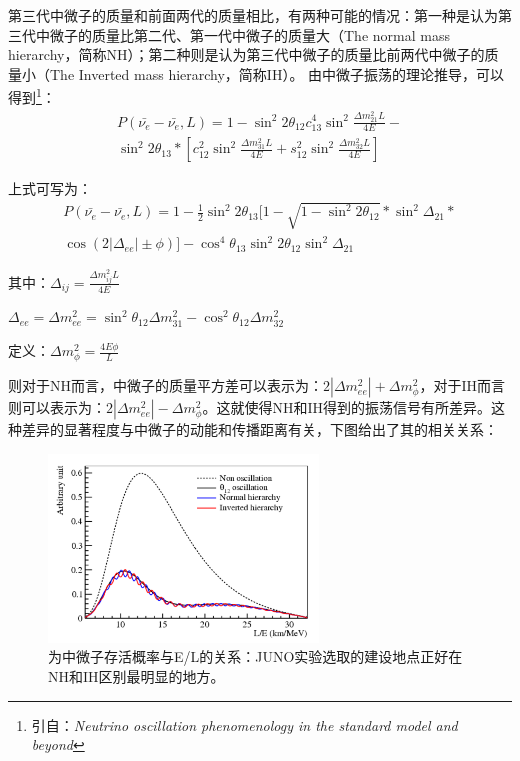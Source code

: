 \documentclass[10pt,a4paper]{article}
\begin{document}
第三代中微子的质量和前面两代的质量相比，有两种可能的情况：第一种是认为第三代中微子的质量比第二代、第一代中微子的质量大（The normal mass hierarchy，简称NH）；第二种则是认为第三代中微子的质量比前两代中微子的质量小（The Inverted mass hierarchy，简称IH）。
由中微子振荡的理论推导，可以得到\footnote{引自：\itshape{Neutrino oscillation phenomenology  in the standard model and beyond}  }：
\[
 \begin{split}
    \label{E1}
     P(\bar{\nu_e}-\bar{\nu_e},L)=1-{\sin^2{2\theta_{12}}} c_{13}^4\sin^2{\frac{\Delta{m_{21}^2}L}{4E}}-\\
\sin^2{2\theta_{13}} *[c_{12}^2\sin^2{\frac{\Delta{m_{31}^2}L}{4E}}+s_{12}^2\sin^2{\frac{\Delta{m_{32}^2}L}{4E}}]
 \end{split}
 \]

上式可写为：
 \begin{equation}
 \begin{split}
    \label{E1}
     P(\bar{\nu_e}-\bar{\nu_e},L)=1-\frac{1}{2}{\sin^2{2\theta_{13}}}[1-\sqrt{1-\sin^2{2\theta_{12}}}*\sin^2{\Delta_{21}}*\\\cos(2|\Delta_{ee}|\pm\phi)] -\cos^4{\theta_{13}}\sin^2{2\theta_{12}}\sin^2{\Delta_{21}} 
 \end{split}
 \end{equation}

其中：$\Delta_{ij}=\frac{\Delta{m_{ij}^2}L}{4E}$

$\Delta_{ee}=\Delta{m_{ee}^2}=\sin^2{\theta_{12}}\Delta{m_{31}^2}-\cos^2{\theta_{12}}\Delta{m_{32}^2}$

定义：$\Delta{m_{\phi}^2}=\frac{4E\phi}{L}$

则对于NH而言，中微子的质量平方差可以表示为：$2|\Delta{m_{ee}^2}|+\Delta{m_{\phi}^2}$，对于IH而言则可以表示为：$2|\Delta{m_{ee}^2}|-\Delta{m_{\phi}^2}$。这就使得NH和IH得到的振荡信号有所差异。这种差异的显著程度与中微子的动能和传播距离有关，下图给出了其的相关关系：
\begin{figure}[ht]
 \centering
 \includegraphics[height=5cm]{images/L-selet.png}
 \caption{为中微子存活概率与E/L的关系：JUNO实验选取的建设地点正好在NH和IH区别最明显的地方。}
 \label{fig:singleblock}
\end{figure}
\end{document}
